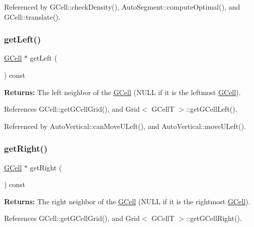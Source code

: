 Referenced by G\+Cell\+::check\+Density(), Auto\+Segment\+::compute\+Optimal(), and G\+Cell\+::translate().

\mbox{\label{classKatabatic_1_1GCell_a633722329744550b6da94c3b6fb97484}} 
\subsubsection{\texorpdfstring{get\+Left()}{getLeft()}}
{\footnotesize\ttfamily \hyperlink{classKatabatic_1_1GCell}{G\+Cell} $\ast$ get\+Left (\begin{DoxyParamCaption}{ }\end{DoxyParamCaption}) const}

{\bfseries Returns\+:} The left neighbor of the \hyperlink{classKatabatic_1_1GCell}{G\+Cell} ({\ttfamily N\+U\+LL} if it is the leftmost \hyperlink{classKatabatic_1_1GCell}{G\+Cell}). 

References G\+Cell\+::get\+G\+Cell\+Grid(), and Grid$<$ G\+Cell\+T $>$\+::get\+G\+Cell\+Left().



Referenced by Auto\+Vertical\+::can\+Move\+U\+Left(), and Auto\+Vertical\+::move\+U\+Left().

\mbox{\label{classKatabatic_1_1GCell_abdeb6b4a351f8b292894d3f0c24f105d}} 
\subsubsection{\texorpdfstring{get\+Right()}{getRight()}}
{\footnotesize\ttfamily \hyperlink{classKatabatic_1_1GCell}{G\+Cell} $\ast$ get\+Right (\begin{DoxyParamCaption}{ }\end{DoxyParamCaption}) const}

{\bfseries Returns\+:} The right neighbor of the \hyperlink{classKatabatic_1_1GCell}{G\+Cell} ({\ttfamily N\+U\+LL} if it is the rightmost \hyperlink{classKatabatic_1_1GCell}{G\+Cell}). 

References G\+Cell\+::get\+G\+Cell\+Grid(), and Grid$<$ G\+Cell\+T $>$\+::get\+G\+Cell\+Right().



